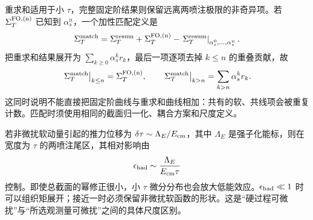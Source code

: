 \begin{derivation}[固定阶匹配与强子化误差的尺度]
重求和适用于小 $\tau$，完整固定阶结果则保留远离两喷注极限的非奇异项。若 $\Sigma_T^{\rm FO,(n)}$ 已知到 $\alpha_s^n$，一个加性匹配定义是
\begin{equation}
 \Sigma_T^{\rm match}
 =\Sigma_T^{\rm resum}+\Sigma_T^{\rm FO,(n)}
 -\left.\Sigma_T^{\rm resum}\right|_{\alpha_s^0,\ldots,\alpha_s^n}.
 \label{eq:qcd-thrust-matching}
\end{equation}
把重求和结果展开为 $\sum_{k\geq0}\alpha_s^kr_k$，最后一项逐项去掉 $k\leq n$ 的重叠贡献，故
\begin{equation*}
 \left.\Sigma_T^{\rm match}\right|_{k\leq n}
 =\Sigma_T^{\rm FO,(n)},\qquad
 \left.\Sigma_T^{\rm match}\right|_{k>n}
 =\sum_{k>n}\alpha_s^kr_k.
\end{equation*}
这同时说明不能直接把固定阶曲线与重求和曲线相加：共有的软、共线项会被重复计数。匹配时须使用相同的截面归一化、耦合方案和尺度定义。

若非微扰软动量引起的推力位移为 $\delta\tau\sim\Lambda_E/E_{\rm cm}$，其中 $\Lambda_E$ 是强子化能标，则在宽度为 $\tau$ 的两喷注尾区，其相对影响由
\begin{equation}
 \epsilon_{\rm had}\sim\frac{\Lambda_E}{E_{\rm cm}\tau}
 \label{eq:qcd-thrust-hadronization-control}
\end{equation}
控制。即使总截面的幂修正很小，小 $\tau$ 微分分布也会放大低能效应。$\epsilon_{\rm had}\ll1$ 时可以组织矩展开；接近一时必须保留非微扰软函数的形状。这是“硬过程可微扰”与“所选观测量可微扰”之间的具体尺度区别。
\end{derivation}
